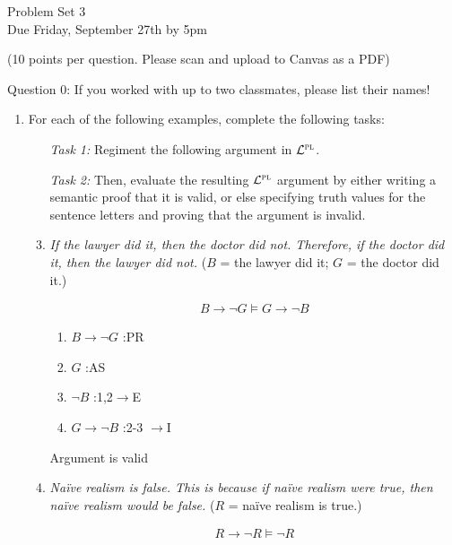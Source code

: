 \documentclass[12pt]{article}
\newcommand{\PL}{\mathcal{L}^{\textsc{pl}}} %
\newcommand{\answer}[1]{%
  \par\noindent
  \begin{tcolorbox}[colback=gray!10, colframe=gray!80, title=Proof]
    #1
  \end{tcolorbox}
}
\begin{document}
\thispagestyle{empty}

\begin{center}
  \Large Problem Set 3\\[1ex] 
  Due Friday, September 27th by 5pm
  \vspace{.15in}

  \normalsize{(10 points per question. Please scan and upload to Canvas as a PDF)}\\[3ex] 
\end{center}

Question 0: If you worked with up to two classmates, please list their names! 

\begin{enumerate}
  \item For each of the following examples, complete the following tasks:
  \begin{enumerate}
    \item[\it Task 1:] Regiment the following argument in $\PL$.
    \item[\it Task 2:] Then, evaluate the resulting $\PL$ argument by either writing a semantic proof that it is valid, or else specifying truth values for the sentence letters and proving that the argument is invalid.
    \item \textit{If the lawyer did it, then the doctor did not. Therefore, if the doctor did it, then the lawyer did not.} ($B$ = the lawyer did it; $G$ = the doctor did it.)
      \answer{
        \begin{align*}
          B\rightarrow\lnot G \models G\rightarrow\lnot B
        \end{align*}

        \begin{enumerate}[label=\arabic*.]
          \item $B\rightarrow\lnot G$ :PR
          \item \qquad $G$ :AS
          \item \qquad $\lnot B$ :1,2$\rightarrow$E
          \item $G\rightarrow\lnot B$ :2-3 $\rightarrow$I
        \end{enumerate}
      
        Argument is valid
      }
    \item \textit{Na\"ive realism is false. This is because if na\"ive realism were true, then na\"ive realism would be false.} ($R$ = na\"ive realism is true.)
      \answer{
        \begin{align*}
          R\rightarrow\lnot R \models \lnot R
        \end{align*}
        \begin{enumerate}[label=\arabic*.]
          

\end{enumerate}}
\end{enumerate}
\end{enumerate}
\end{document}
